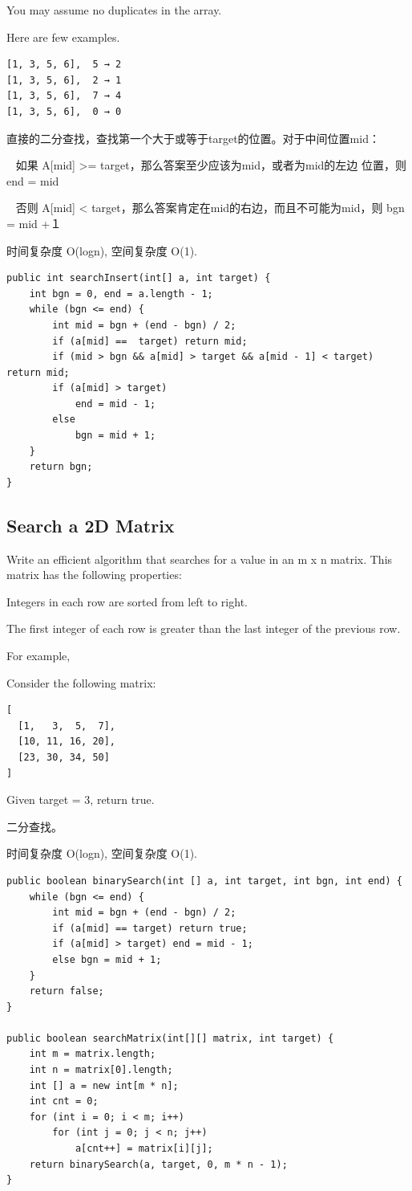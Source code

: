 \documentclass[12pt]{book}
\begin{document}
You may assume no duplicates in the array.

Here are few examples.
\lstset{language=java,label= ,caption= ,numbers=none}
\begin{lstlisting}
[1, 3, 5, 6],  5 → 2
[1, 3, 5, 6],  2 → 1
[1, 3, 5, 6],  7 → 4
[1, 3, 5, 6],  0 → 0
\end{lstlisting}

直接的二分查找，查找第一个大于或等于target的位置。对于中间位置mid：

~ 如果 A[mid] >= target，那么答案至少应该为mid，或者为mid的左边
位置，则 end = mid

~ 否则 A[mid] < target，那么答案肯定在mid的右边，而且不可能为mid，则
bgn = mid +１

时间复杂度 O(logn), 空间复杂度 O(1). 
\lstset{language=java,label= ,caption= ,numbers=none}
\begin{lstlisting}
public int searchInsert(int[] a, int target) {
    int bgn = 0, end = a.length - 1;
    while (bgn <= end) {
        int mid = bgn + (end - bgn) / 2;
        if (a[mid] ==  target) return mid;
        if (mid > bgn && a[mid] > target && a[mid - 1] < target) return mid;
        if (a[mid] > target)
            end = mid - 1;
        else
            bgn = mid + 1;
    }
    return bgn;
}
\end{lstlisting}

\subsection{Search a 2D Matrix}
\label{sec-8-1-3}
Write an efficient algorithm that searches for a value in an m x n matrix. This matrix has the following properties:

Integers in each row are sorted from left to right.

The first integer of each row is greater than the last integer of the previous row.

For example,

Consider the following matrix:
\lstset{language=java,label= ,caption= ,numbers=none}
\begin{lstlisting}
[
  [1,   3,  5,  7],
  [10, 11, 16, 20],
  [23, 30, 34, 50]
]
\end{lstlisting}

Given target = 3, return true.

二分查找。

时间复杂度 O(logn), 空间复杂度 O(1). 

\lstset{language=java,label= ,caption= ,numbers=none}
\begin{lstlisting}
public boolean binarySearch(int [] a, int target, int bgn, int end) {
    while (bgn <= end) {
        int mid = bgn + (end - bgn) / 2;
        if (a[mid] == target) return true;
        if (a[mid] > target) end = mid - 1;
        else bgn = mid + 1;
    }
    return false;
}

public boolean searchMatrix(int[][] matrix, int target) {
    int m = matrix.length;
    int n = matrix[0].length;
    int [] a = new int[m * n];
    int cnt = 0;
    for (int i = 0; i < m; i++) 
        for (int j = 0; j < n; j++) 
            a[cnt++] = matrix[i][j];
    return binarySearch(a, target, 0, m * n - 1);
}
\end{lstlisting}
\end{document}
